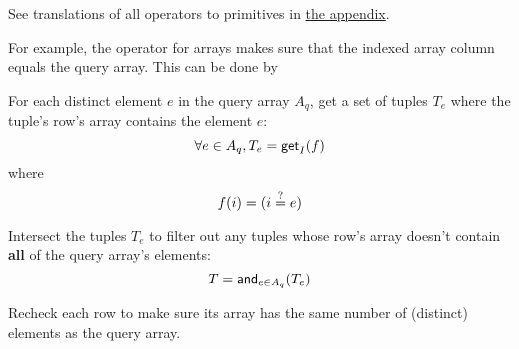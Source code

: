 See translations of all operators to primitives in \protect\hyperlink{%
  operators-to-primitives}{%
  the appendix}.

For example, the \sqlinline{=} operator for arrays makes sure that the indexed
array column equals the query array. This can be done by

\begin{nparts}
\item
  For each distinct element $e$ in the query array $A_q$, get a set of tuples
  $T_e$ where the tuple's row's array contains the element $e$:
  \[
    \forall e \in A_q, T_e = \mathsf{get}_I(f)
  \]
  where
  \[
    f(i) = \lparen i \overset{?}{=} e\rparen
  \]
\item
  Intersect the tuples $T_e$ to filter out any tuples whose row's array doesn't
  contain \textbf{all} of the query array's elements:
  \[
    T = \mathsf{and}_{e \in A_q}(T_e)
  \]
\item
  Recheck each row to make sure its array has the same number of (distinct)
  elements as the query array.
\end{nparts}
